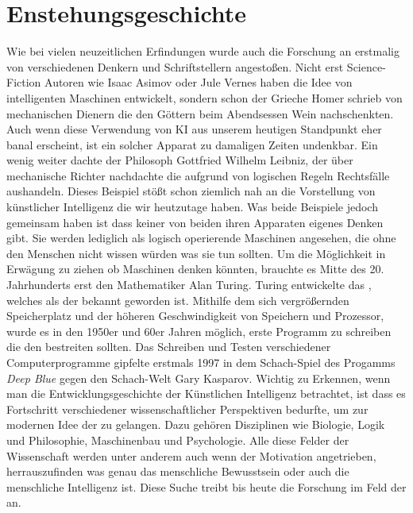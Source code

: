\documentclass[12pt]{report}
\begin{document}
    \chapter{Enstehungsgeschichte}
    Wie bei vielen neuzeitlichen Erfindungen wurde auch die Forschung an 
    erstmalig von verschiedenen Denkern und Schriftstellern angestoßen.
    Nicht erst Science-Fiction Autoren wie Isaac Asimov oder Jule Vernes haben die Idee von intelligenten Maschinen
    entwickelt, sondern schon der Grieche Homer schrieb von mechanischen Dienern die den Göttern beim Abendsessen
    Wein nachschenkten.\cite[53]{buchanan2005very} Auch wenn diese Verwendung von KI aus unserem heutigen Standpunkt
    eher banal erscheint, ist ein solcher Apparat zu damaligen Zeiten undenkbar.
    Ein wenig weiter dachte der Philosoph Gottfried Wilhelm Leibniz, der über mechanische Richter nachdachte
    die aufgrund von logischen Regeln Rechtsfälle aushandeln.\cite[53]{buchanan2005very}
    Dieses Beispiel stößt schon ziemlich nah an die Vorstellung von künstlicher Intelligenz die wir heutzutage haben.
    Was beide Beispiele jedoch gemeinsam haben ist dass keiner von beiden ihren Apparaten eigenes Denken
    gibt. Sie werden lediglich als logisch operierende Maschinen angesehen, die ohne den Menschen nicht wissen würden
    was sie tun sollten.
    Um die Möglichkeit in Erwägung zu ziehen ob Maschinen denken könnten,
    brauchte es Mitte des 20. Jahrhunderts erst den Mathematiker Alan Turing.\cite{sesink1993menschliche}
    Turing entwickelte das , welches als der  bekannt geworden ist.
    Mithilfe dem sich vergrößernden Speicherplatz und der höheren Geschwindigkeit von Speichern und Prozessor,
    wurde es in den 1950er und 60er Jahren möglich, erste Programm zu schreiben die den  bestreiten sollten.
    Das Schreiben und Testen verschiedener Computerprogramme gipfelte erstmals 1997 in dem Schach-Spiel des Progamms \emph{Deep Blue}
    gegen den Schach-Welt Gary Kasparov.\cite{hsu1999ibm}
    Wichtig zu Erkennen, wenn man die Entwicklungsgeschichte der Künstlichen Intelligenz betrachtet, ist dass es Fortschritt verschiedener
    wissenschaftlicher Perspektiven\cite{buchanan2005very} bedurfte, um zur modernen Idee der  zu gelangen.
    Dazu gehören Disziplinen wie Biologie, Logik und Philosophie, Maschinenbau und Psychologie.\cite[56]{buchanan2005very}
    Alle diese Felder der Wissenschaft werden unter anderem auch wenn der Motivation angetrieben, herrauszufinden was genau
    das menschliche Bewusstsein oder auch die menschliche Intelligenz ist.
    Diese Suche treibt bis heute die Forschung im Feld der  an.
\end{document}
